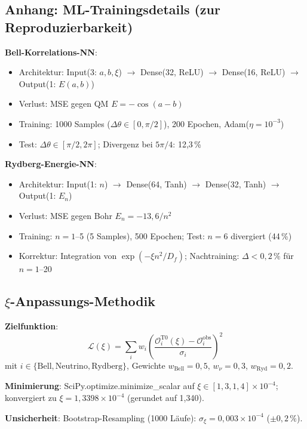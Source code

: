 		\subsection{Anhang: ML-Trainingsdetails (zur Reproduzierbarkeit)}
	
	\textbf{Bell-Korrelations-NN}:
	\begin{itemize}
		\item Architektur: Input(3: $a, b, \xi$) $\to$ Dense(32, ReLU) $\to$ Dense(16, ReLU) $\to$ Output(1: $E(a,b)$)
		\item Verlust: MSE gegen QM $E=-\cos(a-b)$
		\item Training: 1000 Samples ($\Delta\theta \in [0,\pi/2]$), 200 Epochen, Adam($\eta=10^{-3}$)
		\item Test: $\Delta\theta \in [\pi/2, 2\pi]$; Divergenz bei $5\pi/4$: 12{,}3\,\%
	\end{itemize}
	
	\textbf{Rydberg-Energie-NN}:
	\begin{itemize}
		\item Architektur: Input(1: $n$) $\to$ Dense(64, Tanh) $\to$ Dense(32, Tanh) $\to$ Output(1: $E_n$)
		\item Verlust: MSE gegen Bohr $E_n = -13{,}6/n^2$
		\item Training: $n=1$--5 (5 Samples), 500 Epochen; Test: $n=6$ divergiert (44\,\%)
		\item Korrektur: Integration von $\exp(-\xi n^2/D_f)$; Nachtraining: $\Delta<0{,}2\,\%$ für $n=1$--20
	\end{itemize}
	
	\subsection{$\xi$-Anpassungs-Methodik}
	
	\textbf{Zielfunktion}:
	\begin{equation}
		\mathcal{L}(\xi) = \sum_i w_i \left(\frac{\mathcal{O}_i^{\text{T0}}(\xi) - \mathcal{O}_i^{\text{obs}}}{\sigma_i}\right)^2 \tag{A.1}
	\end{equation}
	mit $i \in \{\text{Bell}, \text{Neutrino}, \text{Rydberg}\}$, Gewichte $w_{\text{Bell}}=0{,}5$, $w_{\nu}=0{,}3$, $w_{\text{Ryd}}=0{,}2$.
	
	\textbf{Minimierung}: SciPy.optimize.minimize\_scalar auf $\xi \in [1{,}3, 1{,}4]\times10^{-4}$; konvergiert zu $\xi=1{,}3398\times10^{-4}$ (gerundet auf 1{,}340).
	
	\textbf{Unsicherheit}: Bootstrap-Resampling (1000 Läufe): $\sigma_\xi = 0{,}003\times10^{-4}$ ($\pm0{,}2\,\%$).
	
